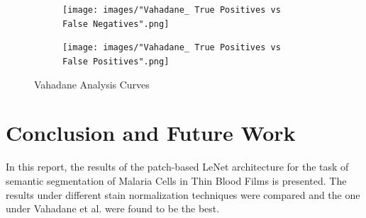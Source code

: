\documentclass{nitk}
\begin{document}
\begin{figure}
    \centering
    \begin{subfigure}{0.45\textwidth}
    \centering
    \texttt{[image: images/"Vahadane\_ True Positives vs False Negatives".png]}
    \end{subfigure} \hfill
    \begin{subfigure}{0.45\textwidth}
    \centering
    \texttt{[image: images/"Vahadane\_ True Positives vs False Positives".png]}
    \end{subfigure}
    \caption{Vahadane Analysis Curves}
    \label{fig:macenko_curves}
\end{figure}

    
    

    
    
    \section{Conclusion and Future Work}
    In this report, the results of the patch-based LeNet architecture for the task of semantic segmentation of Malaria Cells in Thin Blood Films is presented. The results under different stain normalization techniques were compared and the one under Vahadane et al.\cite{vahadane} were found to be the best. 

    \clearpage
    
    
    
    
\end{document}
